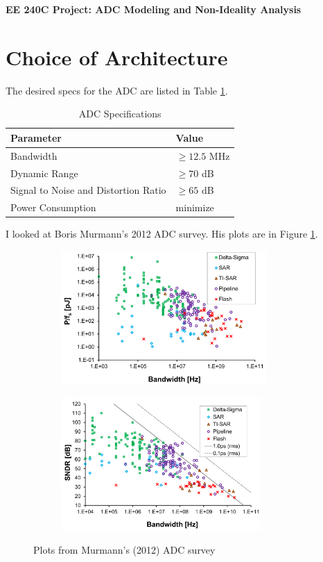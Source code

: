 \documentclass[11pt]{article}
\begin{document}
\begin{center}
  \textbf{\LARGE EE 240C Project: ADC Modeling and Non-Ideality Analysis}
\end{center}

\section{Choice of Architecture}
The desired specs for the ADC are listed in Table \ref{tab:adc_specs}.

\begin{table}[hbt]
  \begin{center}
    \caption{ADC Specifications}
    \label{tab:adc_specs}
    \begin{tabular}{l l}
      \toprule
      \textbf{Parameter} & \textbf{Value} \\
      \midrule
      Bandwidth & $\geq 12.5$ MHz\\
      Dynamic Range & $\geq 70$ dB\\
      Signal to Noise and Distortion Ratio & $\geq 65$ dB\\
      Power Consumption & minimize \\
      \bottomrule
    \end{tabular}
  \end{center}
\end{table}

I looked at Boris Murmann's 2012 ADC survey. His plots are in Figure \ref{fig:adc_survey}.

\begin{figure}[h]
  \centering
  \begin{subfigure}[t]{0.48\textwidth}
    \centering
    \includegraphics[height=2in]{figs/bw_vs_energy.png}
  \end{subfigure}
  \hfill
  \begin{subfigure}[t]{0.48\textwidth}
    \centering
    \includegraphics[height=2in]{figs/bw_vs_sndr.png}
  \end{subfigure}
  \caption{Plots from Murmann's (2012) ADC survey}
  \label{fig:adc_survey}
\end{figure}
\end{document}
